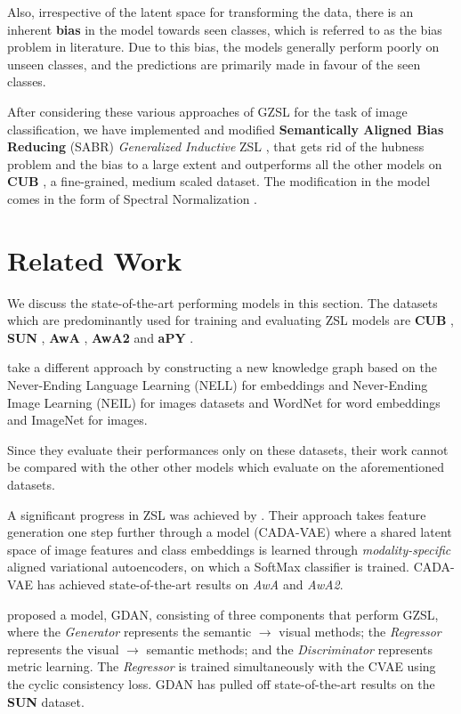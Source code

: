 \documentclass{article}
\begin{document}
Also, irrespective of the latent space for transforming the data, there is an inherent \textbf{bias} in the model towards seen classes, 
which is referred to as the bias problem in literature. 
Due to this bias, the models generally perform poorly on unseen classes, and the predictions are primarily made in favour of the seen classes.

After considering these various approaches of GZSL for the task of image classification, 
we have implemented and modified \textbf{Semantically Aligned Bias Reducing} (SABR) \textit{Generalized Inductive} ZSL \citep{akanksha}, 
that gets rid of the hubness problem and the bias to a large extent and outperforms all the other models on \textbf{CUB} \citep{cub}, a fine-grained, medium scaled dataset.
The modification in the model comes in the form of Spectral Normalization \citep{spectralnorm}. 


\section{Related Work}
\label{related work}
We discuss the state-of-the-art performing models in this section. 
The datasets which are predominantly used for training and evaluating ZSL models are \textbf{CUB} \citep{cub}, \textbf{SUN} \citep{sun}, \textbf{AwA} \citep{awa}, \textbf{AwA2} \citep{awa2}  and \textbf{aPY} \citep{apy}.

\citet{abhinav} take a different approach by constructing a new knowledge graph based on the Never-Ending Language Learning (NELL) for embeddings \citep{gcn3} and Never-Ending Image Learning (NEIL) for images \citep{gcn8} datasets and WordNet for word embeddings and ImageNet for images.

Since they evaluate their performances only on these datasets, their work cannot be compared with the other other models which evaluate on the aforementioned datasets.

A significant progress in ZSL was achieved by \citep{edgar}. 
Their approach takes feature generation one step further through a model (CADA-VAE)
where a shared latent space of image features and class embeddings is learned through \textit{modality-specific} aligned variational autoencoders, 
on which a SoftMax classifier is trained. CADA-VAE has achieved state-of-the-art results on \textit{AwA} and \textit{AwA2}.

\citet{changhu} proposed a model, GDAN, consisting of three components that perform GZSL, where 
the \textit{Generator} represents the semantic $\rightarrow$ visual methods; 
the \textit{Regressor} represents the visual $\rightarrow$ semantic methods; and 
the \textit{Discriminator} represents metric learning. The \textit{Regressor} is trained simultaneously with the CVAE using the cyclic consistency loss.
GDAN has pulled off state-of-the-art results on the \textbf{SUN} \citep{sun} dataset. 
\end{document}
